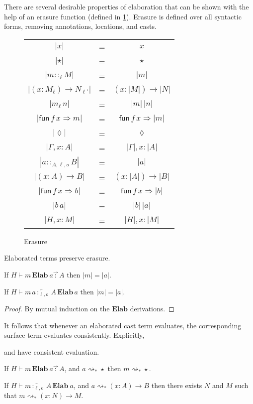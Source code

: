 There are several desirable properties of elaboration that can be shown with the help of an erasure function (defined in \ref{fig:erasure}).
Erasure is defined over all syntactic forms, removing annotations, locations, and casts.

\begin{figure}
\begin{tabular}{ccc}
$|x|$ & = & $x$\tabularnewline
$|\star|$ & = & $\star$\tabularnewline
$|m::_{\ell}M|$ & = & $|m|$\tabularnewline
$|\left(x:M_{\ell}\right)\rightarrow N_{\ell'}|$ & = & $\left(x:|M|\right)\rightarrow|N|$\tabularnewline
$|m_{\ell}\,n|$ & = & $|m|\,|n|$\tabularnewline
$|\mathsf{fun}\,f\,x\Rightarrow m|$ & = & $\mathsf{fun}\,f\,x\Rightarrow|m|$\tabularnewline
$|\lozenge|$ & = & $\lozenge$\tabularnewline
$|\Gamma,x:A|$ & = & $|\Gamma|,x:|A|$\tabularnewline
$|a::_{A,\ell,o}B|$ & = & $|a|$\tabularnewline
$|\left(x:A\right)\rightarrow B|$ & = & $\left(x:|A|\right)\rightarrow|B|$\tabularnewline
$|\mathsf{fun}\,f\,x\Rightarrow b|$ & = & $\mathsf{fun}\,f\,x\Rightarrow|b|$\tabularnewline
$|b\,a|$ & = & $|b|\,|a|$\tabularnewline
$|H,x:M|$ & = & $|H|,x:|M|$\tabularnewline
\end{tabular}
\caption{Erasure}
\label{fig:erasure}
\end{figure}

\begin{thm} Elaborated terms preserve erasure.
 
If $H\vdash m\,\textbf{Elab}\ a\overrightarrow{\,:\,}A$ then $|m|=|a|$.
 
If $H\vdash m\,a\overleftarrow{\,:_{\ell,o}\,}A\,\textbf{Elab}\,a$ then $|m|=|a|$.
\end{thm}
\begin{proof}
By mutual induction on the $\textbf{Elab}$ derivations.
\end{proof}

It follows that whenever an elaborated cast term evaluates, the corresponding surface term evaluates consistently.
Explicitly,
\begin{thm} \Slang{} and \clang{} have consistent evaluation.
 
If $H\vdash m\,\textbf{Elab}\ a\overrightarrow{\,:\,}A$, and $a\rightsquigarrow_{*}\star$ then $m\rightsquigarrow_{*}\star$.
 
If $H\vdash m\overleftarrow{\,:_{\ell,o}\,}A\,\textbf{Elab}\ a$, and $a\rightsquigarrow_{*}(x:A)\rightarrow B$ then there exists $N$ and $M$ such that $m\rightsquigarrow_{*}(x:N)\rightarrow M$.
\end{thm}

